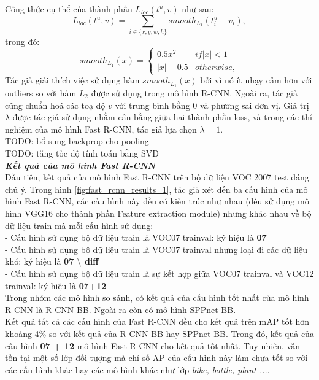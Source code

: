 {        Công thức cụ thể của thành phần $L_{loc}(t^u, v)$ như sau:
        \begin{equation}
            \label{eq:fast_rcnn_bb_loss}
            L_{loc}(t^u, v) = \sum_{i \in \{{x},{y},{w},{h}\}} {smooth}_{L_1}(t^u_i - v_i),
        \end{equation}
        trong đó:
        \begin{equation}
            \label{eq:fast_rcnn_bb_loss_l1}
            {smooth}_{L_1}(x) =
            \begin{cases}
                0.5x^2& {if} |x| < 1 \\
                |x| - 0.5& {otherwise},
            \end{cases}
        \end{equation}
        Tác giả giải thích việc sử dụng hàm ${smooth}_{L_1}(x)$ bởi vì nó ít nhạy cảm hơn với outliers so với hàm ${L_2}$ được sử dụng trong mô hình R-CNN.
        Ngoài ra, tác giả cũng chuẩn hoá các toạ độ $v$ với trung bình bằng 0 và phương sai đơn vị.
        Giá trị $\lambda$ được tác giả sử dụng nhằm cân bằng giữa hai thành phần loss, và trong các thí nghiệm của mô hình Fast R-CNN, tác giả lựa chọn $\lambda = 1$. \\
        TODO: bổ sung backprop cho pooling \\
        TODO: tăng tốc độ tính toán bằng SVD \\

        \noindent
        \textbf{\textit{Kết quả của mô hình Fast R-CNN}} \\
        Đầu tiên, kết quả của mô hình Fast R-CNN trên bộ dữ liệu VOC 2007 test đáng chú ý.
        Trong hình \ref{fig:fast_rcnn_results_1}, tác giả xét đến ba cấu hình của mô hình Fast R-CNN, các cấu hình này đều có kiến trúc như nhau (đều sử dụng mô hình VGG16 cho thành phần Feature extraction module) nhưng khác nhau về bộ dữ liệu train mà mỗi cấu hình sử dụng: \\
        - Cấu hình sử dụng bộ dữ liệu train là VOC07 trainval: ký hiệu là \textbf{07} \\
        - Cấu hình sử dụng bộ dữ liệu train là VOC07 trainval nhưng loại đi các dữ liệu khó: ký hiệu là \textbf{07 $\setminus$ diff} \\
        - Cấu hình sử dụng bộ dữ liệu train là sự kết hợp giữa VOC07 trainval và VOC12 trainval: ký hiệu là \textbf{07+12} \\
        Trong nhóm các mô hình so sánh, có kết quả của cấu hình tốt nhất của mô hình R-CNN là R-CNN BB.
        Ngoài ra còn có mô hình SPPnet BB. \\
        Kết quả tất cả các cấu hình của Fast R-CNN đều cho kết quả trên mAP tốt hơn khoảng 4\% so với kết quả của R-CNN BB hay SPPnet BB.
        Trong đó, kết quả của cấu hình \textbf{07 + 12} mô hình Fast R-CNN cho kết quả tốt nhất.
        Tuy nhiên, vẫn tồn tại một số lớp đối tượng mà chỉ số AP của cấu hình này làm chưa tốt so với các cấu hình khác hay các mô hình khác như lớp \textit{bike, bottle, plant ...}.

}
